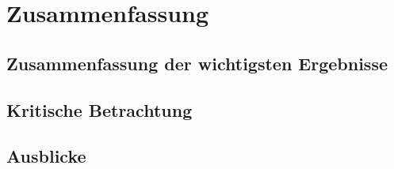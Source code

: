 \section{Zusammenfassung}
    \subsection{Zusammenfassung der wichtigsten Ergebnisse}
        
    \subsection{Kritische Betrachtung}
        

    \subsection{Ausblicke}
        
